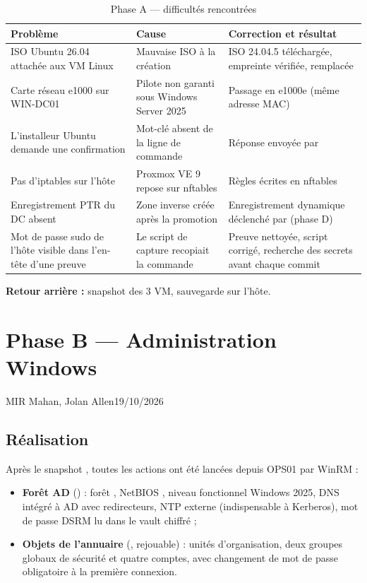 \begin{table}[H]
\centering
\caption{Phase A — difficultés rencontrées}\label{tab:phase-a-diff}
\begin{tabularx}{\linewidth}{@{}P{3.6cm}P{3.6cm}L@{}}
\toprule
\textbf{Problème} & \textbf{Cause} & \textbf{Correction et résultat} \\
\midrule
ISO Ubuntu 26.04 attachée aux VM Linux & Mauvaise ISO à la création & ISO 24.04.5 téléchargée, empreinte vérifiée, remplacée \\
Carte réseau e1000 sur WIN-DC01 & Pilote non garanti sous Windows Server 2025 & Passage en e1000e (même adresse MAC) \\
L'installeur Ubuntu demande une confirmation & Mot-clé  absent de la ligne de commande & Réponse envoyée par  \\
Pas d'iptables sur l'hôte & Proxmox VE 9 repose sur nftables & Règles écrites en nftables \\
Enregistrement PTR du DC absent & Zone inverse créée après la promotion & Enregistrement dynamique déclenché par  (phase D) \\
Mot de passe sudo de l'hôte visible dans l'en-tête d'une preuve & Le script de capture recopiait la commande & Preuve nettoyée, script corrigé, recherche des secrets avant chaque commit \\
\bottomrule
\end{tabularx}
\end{table}

\textbf{Retour arrière :} snapshot  des 3 VM, sauvegarde
 sur l'hôte.

\section{Phase B — Administration Windows}\label{sec:phase-b}

      {MIR Mahan, Jolan Allen}{19/10/2026}{\fait}

\subsection{Réalisation}

Après le snapshot , toutes les actions ont été lancées depuis OPS01 par WinRM :
\begin{itemize}
  \item \textbf{Forêt AD} () : forêt , NetBIOS
        , niveau fonctionnel Windows 2025, DNS intégré à AD avec redirecteurs, NTP
        externe (indispensable à Kerberos), mot de passe DSRM lu dans le vault chiffré ;
  \item \textbf{Objets de l'annuaire} (, rejouable) : unités
        d'organisation, deux groupes globaux de sécurité et quatre comptes, avec changement de mot de
        passe obligatoire à la première connexion.
\end{itemize}

